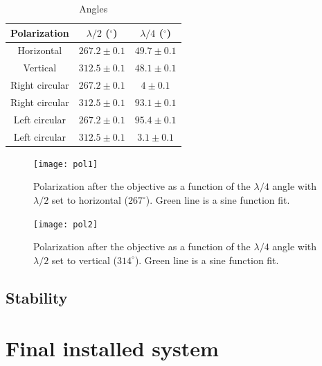 \begin{table}
\centering
\begin{tabular}{c c c}
 \toprule
    {Polarization} & {$\lambda/2$ ($^\circ$)} & {$\lambda/4$ ($^\circ$)} \\ \midrule\midrule
   Horizontal & $267.2\pm 0.1$ & $49.7\pm0.1$  \\
   Vertical   & $312.5\pm0.1$ & $48.1\pm0.1$\\ \midrule
   Right circular & $267.2\pm 0.1$ & $4\pm 0.1$ \\
   Right circular & $312.5\pm0.1$ & $93.1\pm0.1$\\\midrule
  Left circular & $267.2\pm 0.1$ & $95.4\pm0.1$\\
    Left circular & $312.5\pm0.1$  & $3.1\pm0.1$\\ \bottomrule
\end{tabular}
\caption{Angles}
\label{polarizationstable}
\end{table}


\begin{figure}
\centering
\texttt{[image: pol1]}
\caption{Polarization after the objective as a function of the $\lambda/4$ angle with $\lambda/2$ set to horizontal ($267^\circ$). Green line is a sine function fit.}
\label{pol1}
\end{figure}

\begin{figure}
\centering
\texttt{[image: pol2]}
\caption{Polarization after the objective as a function of the $\lambda/4$ angle with $\lambda/2$ set to vertical ($314^\circ$). Green line is a sine function fit.}
\label{pol2}
\end{figure}

\subsection{Stability}
\section{Final installed system}

